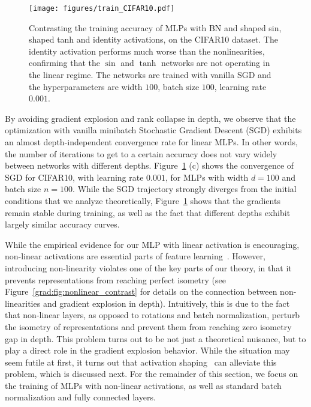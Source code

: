 \begin{figure}[ht]
    \centering
 \texttt{[image: figures/train\_CIFAR10.pdf]}
 \vspace{-.8cm}
    \caption{Contrasting the training accuracy of MLPs with BN and shaped sin, shaped tanh and identity activations, on the CIFAR10 dataset. The identity activation performs much worse than the nonlinearities, confirming that the $\sin$ and $\tanh$ networks are not operating in the linear regime. The networks are trained with vanilla SGD and the hyperparameters are width $100$, batch size $100$, learning rate $0.001$.}
    \vspace{-0.3cm}
    \label{grad:fig:train_cifar10}
\end{figure}


By avoiding gradient explosion and rank collapse in depth, we observe that the optimization with vanilla minibatch Stochastic Gradient Descent (SGD) exhibits an almost depth-independent convergence rate for linear MLPs. In other words, the number of iterations to get to a certain accuracy does not vary widely between networks with different depths. Figure~\ref{grad:fig:train_cifar10} (c) shows the convergence of SGD for CIFAR10, with learning rate $0.001$, for MLPs with width $d=100$ and batch size $n=100.$ While the SGD trajectory strongly diverges from the initial conditions that we analyze theoretically, Figure~\ref{grad:fig:train_cifar10} shows that the gradients remain stable during training, as well as the fact that different depths exhibit largely similar accuracy curves. 




While the empirical evidence for our MLP with linear activation is encouraging, non-linear activations are essential parts of feature learning~\cite{nair2010rectified,klambauer2017self,hendrycks2016gaussian,maas2013rectifier}. However, introducing non-linearity violates one of the key parts of our theory, in that it prevents representations from reaching perfect isometry (see Figure~\ref{grad:fig:nonlinear_contrast} for details on the connection between non-linearities and gradient explosion in depth). Intuitively, this is due to the fact that non-linear layers, as opposed to rotations and batch normalization, perturb the isometry of representations and prevent them from reaching zero isometry gap in depth. This problem turns out to be not just a theoretical nuisance, but to play a direct role in the gradient explosion behavior.
While the situation may seem futile at first, it turns out that activation shaping~\citep{li2022neural,zhang2022deep,martens2021rapid,he2023deep,noci2023shaped} can alleviate this problem, which is discussed next. For the remainder of this section, we focus on the training of MLPs with non-linear activations, as well as standard batch normalization and fully connected layers.

